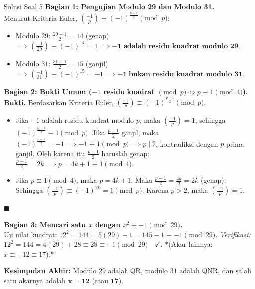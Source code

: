 \documentclass[11pt,a4paper]{article}
\newenvironment{proof}{\noindent\textbf{Bukti.}}{\hfill$\blacksquare$\vspace{0.2em}}
\begin{document}
\begin{solusibox}{Solusi Soal 5}
\textbf{Bagian 1: Pengujian Modulo 29 dan Modulo 31.} \\
Menurut Kriteria Euler, $\left(\frac{-1}{p}\right) \equiv (-1)^{\frac{p-1}{2}} \pmod p$:
\begin{itemize}
    \item Modulo $29$: $\frac{29-1}{2} = 14$ (genap) $\implies \left(\frac{-1}{29}\right) \equiv (-1)^{14} = 1 \implies \mathbf{-1 \text{ adalah residu kuadrat modulo } 29.}$
    \item Modulo $31$: $\frac{31-1}{2} = 15$ (ganjil) $\implies \left(\frac{-1}{31}\right) \equiv (-1)^{15} = -1 \implies \mathbf{-1 \text{ bukan residu kuadrat modulo } 31.}$
\end{itemize}

\textbf{Bagian 2: Bukti Umum ($-1$ residu kuadrat $\pmod p \iff p \equiv 1 \pmod 4$).}
\begin{proof}
Berdasarkan Kriteria Euler, $\left(\frac{-1}{p}\right) \equiv (-1)^{\frac{p-1}{2}} \pmod p$.
\begin{itemize}[leftmargin=*]
    \item[$(\Rightarrow)$] Jika $-1$ adalah residu kuadrat modulo $p$, maka $\left(\frac{-1}{p}\right) = 1$, sehingga $(-1)^{\frac{p-1}{2}} \equiv 1 \pmod p$.  
    Jika $\frac{p-1}{2}$ ganjil, maka $(-1)^{\frac{p-1}{2}} = -1 \implies -1 \equiv 1 \pmod p \implies p \mid 2$, kontradiksi dengan $p$ prima ganjil.  
    Oleh karena itu $\frac{p-1}{2}$ haruslah genap: $\frac{p-1}{2} = 2k \implies p = 4k + 1 \equiv 1 \pmod 4$.
    
    \item[$(\Leftarrow)$] Jika $p \equiv 1 \pmod 4$, maka $p = 4k + 1$. Maka $\frac{p-1}{2} = \frac{4k}{2} = 2k$ (genap).  
    Sehingga $\left(\frac{-1}{p}\right) \equiv (-1)^{2k} = 1 \pmod p$. Karena $p > 2$, maka $\left(\frac{-1}{p}\right) = 1$.
\end{itemize}
\end{proof}

\textbf{Bagian 3: Mencari satu $x$ dengan $x^2 \equiv -1 \pmod{29}$.} \\
Uji nilai kuadrat: $12^2 = 144 = 5(29) - 1 = 145 - 1 \equiv -1 \pmod{29}$.  
\textit{Verifikasi:} $12^2 = 144 = 4(29) + 28 \equiv 28 \equiv -1 \pmod{29} \quad \checkmark$. *(Akar lainnya: $x \equiv -12 \equiv 17$).*

\vspace{0.1cm}
\textbf{Kesimpulan Akhir:} Modulo $29$ adalah QR, modulo $31$ adalah QNR, dan salah satu akarnya adalah $\mathbf{x = 12}$ (atau $\mathbf{17}$).
\end{solusibox}
\end{document}
